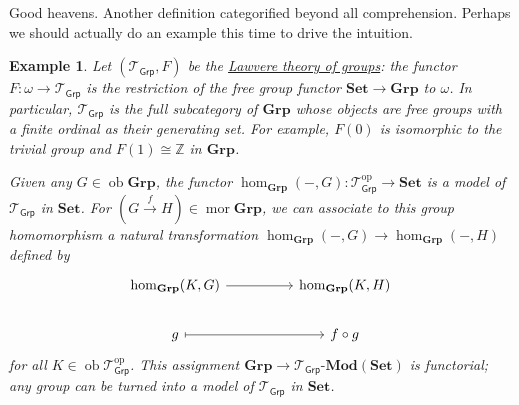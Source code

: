 \documentclass[a4paper,11pt]{article}
\theoremstyle{break_italics}
\theoremstyle{break_upright}
\newtheorem*{example*}{Example}
\theoremstyle{remark}
\newcommand{\Z}{\mathbb{Z}}
\newcommand{\ob}{\operatorname{ob}}
\newcommand{\mor}{\operatorname{mor}}
\newcommand{\Set}{\mathbf{Set}}
\newcommand{\op}{\mathrm{op}}
\begin{document}
Good heavens. Another definition categorified beyond all comprehension. Perhaps we should actually do an example this time to drive the intuition.

\begin{example*}
	Let $(\mathcal T_{\mathsf{Grp}}, F)$ be the \uline{Lawvere theory of groups}: the functor $F \colon \omega \to \mathcal T_{\mathsf{Grp}}$ is the restriction of the free group functor $\Set \to \mathbf{Grp}$ to $\omega$. In particular, $\mathcal T_{\mathsf{Grp}}$ is the full subcategory of $\mathbf{Grp}$ whose objects are free groups with a finite ordinal as their generating set. For example, $F(0)$ is isomorphic to the trivial group and $F(1)\cong \Z$ in $\mathbf{Grp}$.
	
	Given any $G \in \ob\mathbf{Grp}$, the functor $\hom_{\mathbf{Grp}}(-, G) \colon \mathcal T_{\mathsf{Grp}}^\op \to \Set$ is a model of $\mathcal T_{\mathsf{Grp}}$ in $\Set$. For $(G \xrightarrow{f} H) \in \mor \mathbf{Grp}$, we can associate to this group homomorphism a natural transformation $\hom_{\mathbf{Grp}}(-,G) \to \hom_{\mathbf{Grp}}(-, H)$ defined by
	\[
\begin{tikzcd}
{\hom_{\mathbf{Grp}}(K,G)} \arrow[rr] &  & {\hom_{\mathbf{Grp}}(K,H)} \\
g \arrow[rr, maps to]                 &  & f \circ g                 
\end{tikzcd}
	\]
	for all $K \in \ob\mathcal T_{\mathsf{Grp}}^\op$. This assignment $\mathbf{Grp} \to \mathcal T_{\mathsf{Grp}}\text{-}\mathbf{Mod}(\Set)$ is functorial; any group can be turned into a model of $\mathcal T_{\mathsf{Grp}}$ in $\Set$.
	

\end{example*}
\end{document}
